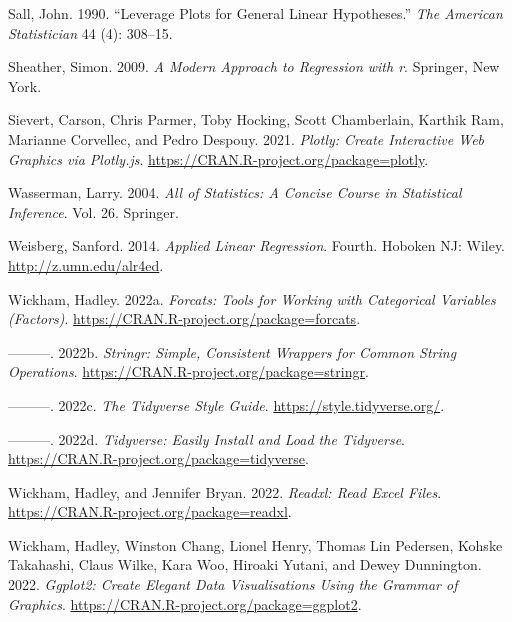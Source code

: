 \documentclass[
]{book}
\newlength{\cslhangindent}
\newlength{\cslentryspacingunit} %
\newenvironment{CSLReferences}[2] %
 {%
  \setlength{\parindent}{0pt}
  \ifodd #1
  \let\oldpar\par
  \def\par{\hangindent=\cslhangindent\oldpar}
  \fi
  \setlength{\parskip}{#2\cslentryspacingunit}
 }%
 {}
\theoremstyle{definition}
\theoremstyle{definition}
\theoremstyle{definition}
\theoremstyle{definition}
\theoremstyle{remark}
\begin{document}
\begin{CSLReferences}{1}{0}
\leavevmode{}%
Sall, John. 1990. {``Leverage Plots for General Linear Hypotheses.''} \emph{The American Statistician} 44 (4): 308--15.

\leavevmode{}%
Sheather, Simon. 2009. \emph{A Modern Approach to Regression with r}. Springer, New York.

\leavevmode{}%
Sievert, Carson, Chris Parmer, Toby Hocking, Scott Chamberlain, Karthik Ram, Marianne Corvellec, and Pedro Despouy. 2021. \emph{Plotly: Create Interactive Web Graphics via Plotly.js}. \url{https://CRAN.R-project.org/package=plotly}.

\leavevmode{}%
Wasserman, Larry. 2004. \emph{All of Statistics: A Concise Course in Statistical Inference}. Vol. 26. Springer.

\leavevmode{}%
Weisberg, Sanford. 2014. \emph{Applied Linear Regression}. Fourth. Hoboken {NJ}: Wiley. \url{http://z.umn.edu/alr4ed}.

\leavevmode{}%
Wickham, Hadley. 2022a. \emph{Forcats: Tools for Working with Categorical Variables (Factors)}. \url{https://CRAN.R-project.org/package=forcats}.

\leavevmode{}%
---------. 2022b. \emph{Stringr: Simple, Consistent Wrappers for Common String Operations}. \url{https://CRAN.R-project.org/package=stringr}.

\leavevmode{}%
---------. 2022c. \emph{The Tidyverse Style Guide}. \url{https://style.tidyverse.org/}.

\leavevmode{}%
---------. 2022d. \emph{Tidyverse: Easily Install and Load the Tidyverse}. \url{https://CRAN.R-project.org/package=tidyverse}.

\leavevmode{}%
Wickham, Hadley, and Jennifer Bryan. 2022. \emph{Readxl: Read Excel Files}. \url{https://CRAN.R-project.org/package=readxl}.

\leavevmode{}%
Wickham, Hadley, Winston Chang, Lionel Henry, Thomas Lin Pedersen, Kohske Takahashi, Claus Wilke, Kara Woo, Hiroaki Yutani, and Dewey Dunnington. 2022. \emph{Ggplot2: Create Elegant Data Visualisations Using the Grammar of Graphics}. \url{https://CRAN.R-project.org/package=ggplot2}.


\end{CSLReferences}
\end{document}
